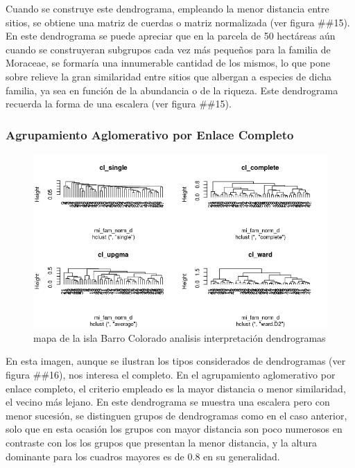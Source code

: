 \documentclass[11pt,]{article}
\begin{document}
Cuando se construye este dendrograma, empleando la menor distancia entre
sitios, se obtiene una matriz de cuerdas o matriz normalizada (ver
figura \#\#15). En este dendrograma se puede apreciar que en la parcela
de 50 hectáreas aún cuando se construyeran subgrupos cada vez más
pequeños para la familia de Moraceae, se formaría una innumerable
cantidad de los mismos, lo que pone sobre relieve la gran similaridad
entre sitios que albergan a especies de dicha familia, ya sea en función
de la abundancia o de la riqueza. Este dendrograma recuerda la forma de
una escalera (ver figura \#\#15).

\subsubsection{Agrupamiento Aglomerativo por Enlace
Completo}\label{agrupamiento-aglomerativo-por-enlace-completo}

\begin{figure}
\centering
\includegraphics[width=1.00000\textwidth]{analisis_interpretacion_dendrogramas.png}
\caption{mapa de la isla Barro Colorado analisis interpretación
dendrogramas \label{fig:bci_map}}
\end{figure}

En esta imagen, aunque se ilustran los tipos considerados de
dendrogramas (ver figura \#\#16), nos interesa el completo. En el
agrupamiento aglomerativo por enlace completo, el criterio empleado es
la mayor distancia o menor similaridad, el vecino más lejano. En este
dendrograma se muestra una escalera pero con menor sucesión, se
distinguen grupos de dendrogramas como en el caso anterior, solo que en
esta ocasión los grupos con mayor distancia son poco numerosos en
contraste con los los grupos que presentan la menor distancia, y la
altura dominante para los cuadros mayores es de 0.8 en su generalidad.
\end{document}

